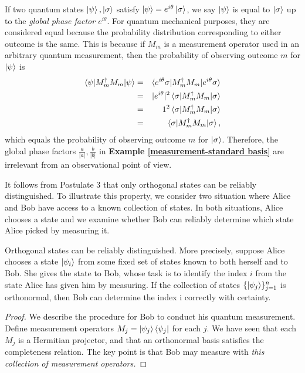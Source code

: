 {If two quantum states $\ket{\psi}, \ket{\sigma}$ satisfy $\ket{\psi}=e^{i\theta}\ket{\sigma}$, we say $\ket{\psi}$ is equal to $\ket{\sigma}$ up to the \textit{global phase factor $e^{i\theta}$}. For quantum mechanical purposes, they are considered equal because the probability distribution corresponding to either outcome is the same. This is because if $M_m$ is a measurement operator used in an arbitrary quantum measurement, then the probability of observing outcome $m$ for $\ket{\psi}$ is 
\begin{eqnarray}
\braket{\psi|M_m^\dagger M_m|\psi} &=& \braket{e^{i\theta}\sigma|M_m^\dagger M_m|e^{i\theta} \sigma} \\
&=& |e^{i\theta}|^2\braket{\sigma|M_m^\dagger M_m| \sigma} \\
&=& 1^2\braket{\sigma|M_m^\dagger M_m| \sigma} \\
&=& \braket{\sigma|M_m^\dagger M_m| \sigma} ,
\end{eqnarray}
which equals the probability of observing outcome $m$ for $\ket{\sigma}$.  Therefore, the global phase factors $\frac{a}{|a|}, \frac{b}{|b|}$ in \textbf{Example \ref{measurement-standard basis}} are irrelevant from an observational point of view.

\bigskip
It follows from Postulate 3 that only orthogonal states can be reliably distinguished. To illustrate this property, we consider two situation where Alice and Bob have access to a known collection of states.  In both situations, Alice chooses a state and we examine whether Bob can reliably determine which state Alice picked by measuring it.

\begin{example} \label{example: orthogonal states for measurements}
Orthogonal states can be reliably distinguished. More precisely, suppose Alice chooses a state $\ket{\psi_i}$ from some fixed set of states known to both herself and to Bob. She gives the state to Bob, whose task is to identify the index $i$ from the state Alice has given him by measuring. If the collection of states $\{\ket{\psi_j}\}_{j=1}^n$ is orthonormal, then Bob can determine the index i correctly with certainty.
\end{example}
\begin{proof}
We describe the procedure for Bob to conduct his quantum measurement.  Define measurement operators $M_j=\ket{\psi_j}\bra{\psi_j}$ for each $j$.  We have seen that each $M_j$ is a Hermitian projector, and that an orthonormal basis satisfies the completeness relation.  The key point is that Bob may measure with {\emph{this collection of measurement operators.}}


\end{proof}}
